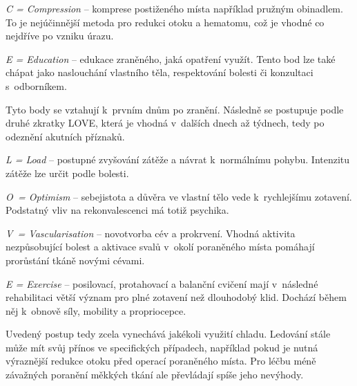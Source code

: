 \documentclass[11pt]{article}
\begin{document}
\textit{C = Compression} – komprese postiženého místa například pružným obinadlem. To je nejúčinnější metoda pro redukci otoku a hematomu, což je vhodné co nejdříve po vzniku úrazu. 

\textit{E = Education} – edukace zraněného, jaká opatření využít. Tento bod lze také chápat jako naslouchání vlastního těla, respektování bolesti či konzultaci s~odborníkem.


Tyto body se vztahují k~prvním dnům po zranění. Následně se postupuje podle druhé zkratky LOVE, která je vhodná v~dalších dnech až týdnech, tedy po odeznění akutních příznaků.

\vspace*{6pt}

\textit{L = Load} – postupné zvyšování zátěže a návrat k~normálnímu pohybu. Intenzitu zátěže lze určit podle bolesti.

\textit{O~= Optimism} – sebejistota a důvěra ve vlastní tělo vede k~rychlejšímu zotavení. Podstatný vliv na rekonvalescenci má totiž psychika.

\textit{V~= Vascularisation} – novotvorba cév a prokrvení. Vhodná aktivita nezpůsobující bolest a aktivace svalů v~okolí poraněného místa pomáhají prorůstání tkáně novými cévami. 

\textit{E = Exercise} – posilovací, protahovací a balanční cvičení mají v~následné rehabilitaci větší význam pro plné zotavení než dlouhodobý klid. Dochází během něj k~obnově síly, mobility a propriocepce.

\vspace*{6pt}

Uvedený postup tedy zcela vynechává jakékoli využití chladu. Ledování stále může mít svůj přínos ve specifických případech, například pokud je nutná výraznější redukce otoku před operací poraněného místa. Pro léčbu méně závažných poranění měkkých tkání ale převládají spíše jeho nevýhody.

\signature{Michal Přibyl}{}

\clearpage

\pagestyle{blank}

\vspace*{96pt}

\pagecolor{sokolred}
\color{white}

\end{document}
